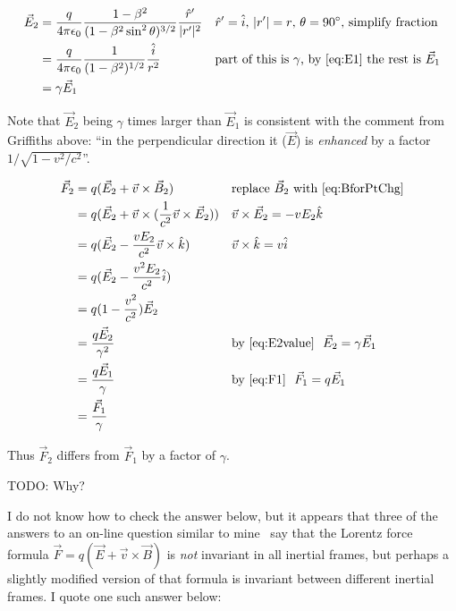 \documentclass[a4paper]{article}
\theoremstyle{plain}
\theoremstyle{definition}
\newcommand{\rhat}{\hat{r}}
\newcommand{\vect}[1]{\vec{#1}}
\newcommand{\hatvec}[1]{\hat{#1}}
\newcommand{\ihat}{\hatvec{i}}
\newcommand{\khat}{\hatvec{k}}
\begin{document}
\begin{align}
\vect{E}_2
  & = \frac{q}{4 \pi \epsilon_0} \frac{1-\beta^2}{(1-\beta^2 \sin^2 \theta)^{3/2}} \frac{{\rhat}'}{|r'|^2} & & \text{${\rhat}' = \ihat$, $|r'| = r$, $\theta=90^{\circ}$, simplify fraction} \nonumber \\
  & = \frac{q}{4 \pi \epsilon_0} \frac{1}{(1-\beta^2)^{1/2}} \frac{\ihat}{r^2} & & \text{part of this is $\gamma$, by~\eqref{eq:E1} the rest is $\vect{E}_1$} \nonumber \\
  & = \gamma \vect{E}_1 \label{eq:E2value}
\end{align}

Note that $\vect{E}_2$ being $\gamma$ times larger than $\vect{E}_1$
is consistent with the comment from Griffiths above: ``in the
perpendicular direction it ($\vect{E}$) is {\em enhanced} by a factor
$1 / \sqrt{ 1 - v^2/c^2}$''.

\begin{align*}
\vect{F}_2
  & = q (\vect{E}_2 + \vect{v} \times \vect{B}_2)   & & \text{replace $\vect{B}_2$ with \eqref{eq:BforPtChg}} \\
  & = q (\vect{E}_2 + \vect{v} \times (\frac{1}{c^2} \vect{v} \times \vect{E}_2))  & & \vect{v} \times \vect{E}_2 = - v E_2 \khat \\
  & = q (\vect{E}_2 - \frac{v E_2}{c^2} \vect{v} \times \khat)  & & \vect{v} \times \khat = v \ihat \\
  & = q (\vect{E}_2 - \frac{v^2 E_2}{c^2} \ihat) \\
  & = q (1 - \frac{v^2}{c^2}) \vect{E}_2 \\
  & = \frac{q \vect{E}_2}{\gamma^2} & & \text{by~\eqref{eq:E2value} \ } \vect{E}_2 = \gamma \vect{E}_1 \\
  & = \frac{q \vect{E}_1}{\gamma} & & \text{by~\eqref{eq:F1} \ } \vect{F}_1 = q \vect{E}_1 \\
  & = \frac{\vect{F}_1}{\gamma}
\end{align*}

Thus $\vect{F}_2$ differs from $\vect{F}_1$ by a factor of $\gamma$.

TODO: Why?

I do not know how to check the answer below, but it appears that three
of the answers to an on-line question similar to
mine~\cite{PhysicsSEIsLorentzForceFrameIndependent} say that the
Lorentz force formula $\vect{F} = q(\vect{E} + \vect{v} \times
\vect{B})$ is {\em not} invariant in all inertial frames, but perhaps
a slightly modified version of that formula is invariant between
different inertial frames.  I quote one such answer below:
\end{document}
